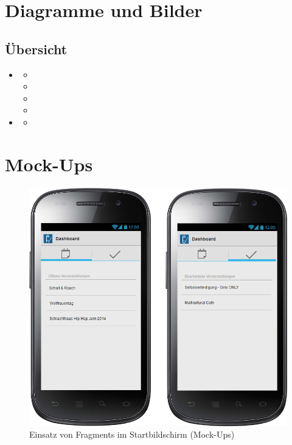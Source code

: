 \documentclass[Bachelorarbeit.tex]{subfiles}
\begin{document}
\chapter{Diagramme und Bilder}
\label{chap:diagramme_und_bilder}




\section{Übersicht}
\begin{itemize} 
\item {}
\begin{itemize}
\item {}
\item {}
\item {}
\item {}
\end{itemize}
\item {}
\begin{itemize}
\item {}
\end{itemize}

\end{itemize}

\newpage
\chapter*{Mock-Ups}
\label{sec:mock_ups}

\begin{figure}
\centering
\includegraphics[height=0.7\textheight, angle=90]{./img/mockup_android_dashboard}
\caption[Startbildschirm - Android (Mock-Ups)]{Einsatz von Fragments im Startbildschirm (Mock-Ups)}
\label{fig:mockup_android_dashboard}
\end{figure}
\newpage
\end{document}

